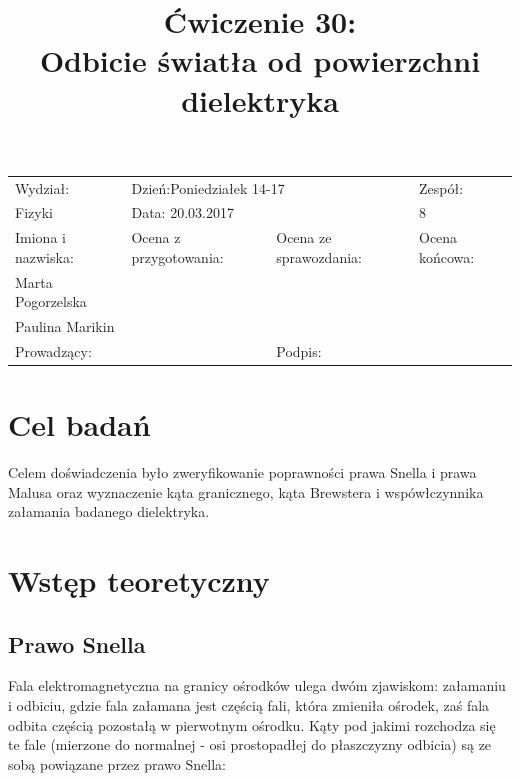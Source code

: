 \documentclass[a4paper,10pt]{article}
\def\arraystretch{1.2}
\begin{document}
\begin{table}
  \centering
  \def\arraystretch{1.5}
    \begin{tabular}{|l|l|l|l|} \hline
    Wydział:           & \multicolumn{2}{l|}{Dzień:Poniedziałek 14-17}    &Zespół:  \\
    Fizyki             &    \multicolumn{2}{l|}{Data: 20.03.2017}         &8             \\\hline
    Imiona i nazwiska: &Ocena z przygotowania:  &Ocena ze sprawozdania:   &Ocena końcowa: \\
    Marta Pogorzelska  &                        &                         &                \\
    Paulina Marikin    &                        &                         &\\\hline
    \multicolumn{2}{|l|}{Prowadzący:                 } &\multicolumn{2}{l|}{Podpis:             }  \\\hline
  \end{tabular}
\end{table}

\title{Ćwiczenie 30:\\Odbicie światła od powierzchni dielektryka}
\date{}
\maketitle

\section{Cel badań}
Celem doświadczenia było zweryfikowanie poprawności prawa Snella i prawa Malusa oraz wyznaczenie
kąta granicznego, kąta Brewstera i wspówłczynnika załamania badanego dielektryka.

\section{Wstęp teoretyczny}
\subsection{Prawo Snella}
Fala elektromagnetyczna na granicy ośrodków ulega dwóm zjawiskom: załamaniu i odbiciu, gdzie fala załamana jest częścią fali, która zmieniła ośrodek, zaś fala odbita częścią pozostałą w pierwotnym ośrodku. Kąty pod jakimi rozchodza się te fale (mierzone do normalnej - osi prostopadłej do płaszczyzny odbicia) są ze sobą powiązane przez prawo Snella:
\end{document}
